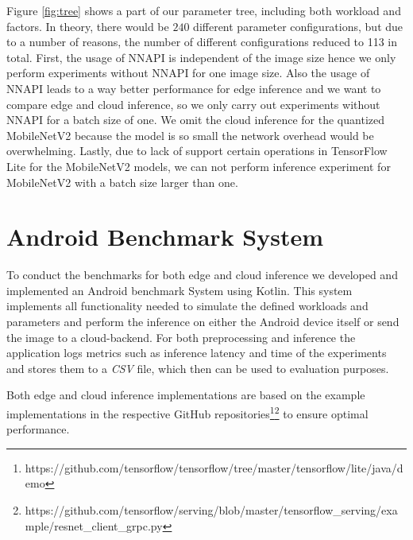 \vspace{15pt}
Figure \ref{fig:tree} shows a part of our parameter tree, including both workload and factors. In theory, there would be $240$ different parameter configurations, but due to a number of reasons, the number of different configurations reduced to 113 in total.
First, the usage of NNAPI is independent of the image size hence we only perform experiments without NNAPI for one image size. Also the usage of NNAPI leads to a way better performance for edge inference and we want to compare edge and cloud inference, so we only carry out experiments without NNAPI for a batch size of one.
We omit the cloud inference for the quantized MobileNetV2 because the model is so small the network overhead would be overwhelming.
Lastly, due to lack of support certain operations in TensorFlow Lite for the MobileNetV2 models, we can not perform inference experiment for MobileNetV2 with a batch size larger than one.

\section{Android Benchmark System}
\label{chap:androidApp}
To conduct the benchmarks for both edge and cloud inference we developed and implemented an Android benchmark System using Kotlin.
This system implements all functionality needed to simulate the defined workloads and parameters and perform the inference on either the Android device itself or send the image to a cloud-backend.
For both preprocessing and inference the application logs metrics such as inference latency and time of the experiments and stores them to a \emph{CSV} file, which then can be used to evaluation purposes.

Both edge and cloud inference implementations are based on the example implementations in the respective GitHub repositories\footnote{https://github.com/tensorflow/tensorflow/tree/master/tensorflow/lite/java/demo}\footnote{https://github.com/tensorflow/serving/blob/master/tensorflow\_serving/example/resnet\_client\_grpc.py} to ensure optimal performance. 


